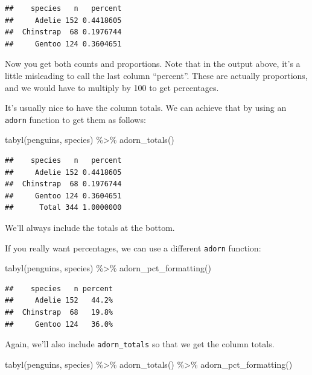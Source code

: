 \documentclass[
]{book}
\newenvironment{Shaded}{\begin{snugshade}}{\end{snugshade}}
\newcommand{\FunctionTok}[1]{\textcolor[rgb]{0.00,0.00,0.00}{#1}}
\newcommand{\NormalTok}[1]{#1}
\newcommand{\SpecialCharTok}[1]{\textcolor[rgb]{0.00,0.00,0.00}{#1}}
\begin{document}
\begin{verbatim}
##    species   n   percent
##     Adelie 152 0.4418605
##  Chinstrap  68 0.1976744
##     Gentoo 124 0.3604651
\end{verbatim}

Now you get both counts and proportions. Note that in the output above, it's a little misleading to call the last column ``percent''. These are actually proportions, and we would have to multiply by 100 to get percentages.

It's usually nice to have the column totals. We can achieve that by using an \texttt{adorn} function to get them as follows:

\begin{Shaded}
\begin{Highlighting}[]
\FunctionTok{tabyl}\NormalTok{(penguins, species) }\SpecialCharTok{\%\textgreater{}\%}
  \FunctionTok{adorn\_totals}\NormalTok{()}
\end{Highlighting}
\end{Shaded}

\begin{verbatim}
##    species   n   percent
##     Adelie 152 0.4418605
##  Chinstrap  68 0.1976744
##     Gentoo 124 0.3604651
##      Total 344 1.0000000
\end{verbatim}

We'll always include the totals at the bottom.

If you really want percentages, we can use a different \texttt{adorn} function:

\begin{Shaded}
\begin{Highlighting}[]
\FunctionTok{tabyl}\NormalTok{(penguins, species) }\SpecialCharTok{\%\textgreater{}\%}
    \FunctionTok{adorn\_pct\_formatting}\NormalTok{()}
\end{Highlighting}
\end{Shaded}

\begin{verbatim}
##    species   n percent
##     Adelie 152   44.2%
##  Chinstrap  68   19.8%
##     Gentoo 124   36.0%
\end{verbatim}

Again, we'll also include \texttt{adorn\_totals} so that we get the column totals.

\begin{Shaded}
\begin{Highlighting}[]
\FunctionTok{tabyl}\NormalTok{(penguins, species) }\SpecialCharTok{\%\textgreater{}\%}
    \FunctionTok{adorn\_totals}\NormalTok{() }\SpecialCharTok{\%\textgreater{}\%}
    \FunctionTok{adorn\_pct\_formatting}\NormalTok{()}
\end{Highlighting}
\end{Shaded}
\end{document}
